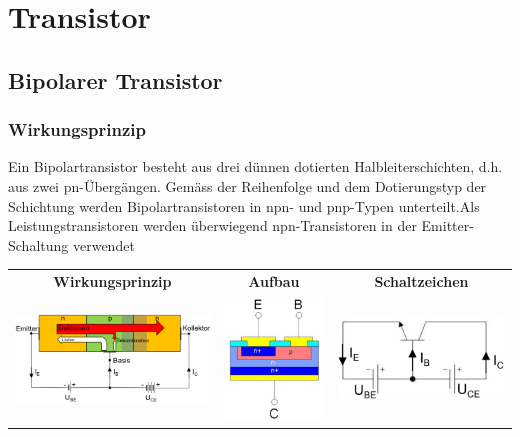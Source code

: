
\section{Transistor}
\vspace{-0.2cm}
\subsection{Bipolarer Transistor}
\vspace{-0.2cm}
\subsubsection{Wirkungsprinzip}
Ein Bipolartransistor besteht aus drei dünnen dotierten Halbleiterschichten, d.h. aus zwei pn-Übergängen. Gemäss der Reihenfolge und dem Dotierungstyp der Schichtung werden Bipolartransistoren in npn- und pnp-Typen unterteilt.\newline Als Leistungstransistoren werden überwiegend npn-Transistoren in der Emitter-Schaltung verwendet\newline
\hspace*{2cm}
\begin{tabular}{ccc}
     \textbf{Wirkungsprinzip}&\textbf{Aufbau}&\textbf{Schaltzeichen}\\
     \includegraphics[width=0.35\linewidth]{images/npnTransistor}&
     \includegraphics[width=0.15\linewidth]{images/aufbautransnpn}&
     \includegraphics[width=0.25\linewidth]{images/esbtransnpn} \\
\end{tabular}

